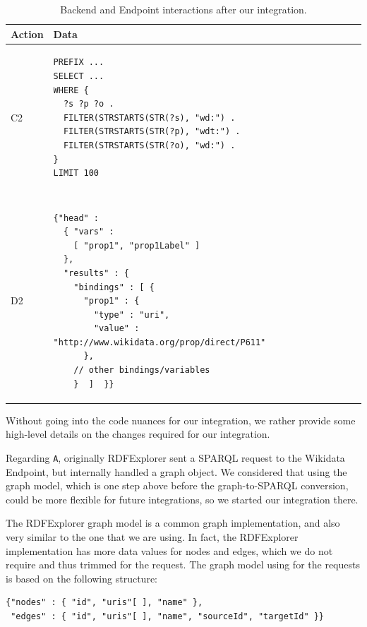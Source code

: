 \begin{table}[h]
\centering
\begin{tabular}{ll}
Action & Data \\ 
\hline
C2             
& \begin{minipage}[t]{0.85\linewidth}
\begin{verbatim}
PREFIX ...
SELECT ... 
WHERE {
  ?s ?p ?o .
  FILTER(STRSTARTS(STR(?s), "wd:") .
  FILTER(STRSTARTS(STR(?p), "wdt:") .
  FILTER(STRSTARTS(STR(?o), "wd:") .
} 
LIMIT 100
\end{verbatim}
\end{minipage}
\\ \\ \\
D2             
& \begin{minipage}[t]{0.85\linewidth}
\begin{verbatim}
{"head" : 
  { "vars" : 
    [ "prop1", "prop1Label" ] 
  },
  "results" : {
    "bindings" : [ {
      "prop1" : {
        "type" : "uri",
        "value" : "http://www.wikidata.org/prop/direct/P611"
      }, 
    // other bindings/variables
    }  ]  }}
\end{verbatim}
\end{minipage}
\\
\end{tabular}
\caption{Backend and Endpoint interactions after our integration.}
\label{table:uiAfterRequest2}
\end{table}

Without going into the code nuances for our integration, we rather provide some high-level details on the changes required for our integration. 

Regarding \texttt{A}, originally RDFExplorer sent a SPARQL request to the Wikidata Endpoint, but internally handled a graph object. We considered that using the graph model, which is one step above before the graph-to-SPARQL conversion, could be more flexible for future integrations, so we started our integration there.

The RDFExplorer graph model is a common graph implementation, and also very similar to the one that we are using. In fact, the RDFExplorer implementation has more data values for nodes and edges, which we do not require and thus trimmed for the request. The graph model using for the requests is based on the following structure:
\begin{verbatim}
{"nodes" : { "id", "uris"[ ], "name" },
 "edges" : { "id", "uris"[ ], "name", "sourceId", "targetId" }}
\end{verbatim}

